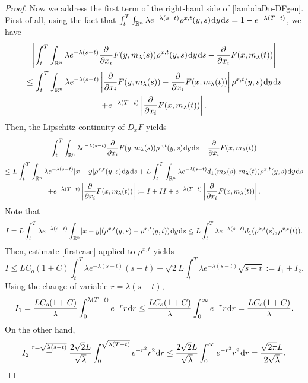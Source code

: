 \documentclass{amsart}
\theoremstyle{remark}
\theoremstyle{definition}
\theoremstyle{Claim}
\newcommand{\R}{\mathbb{R}}
\newcommand{\dd}{\hspace{0.7pt}{\rm d}}
\theoremstyle{plain}
\begin{document}
\begin{proof}
	Now we address the first term of the right-hand side of \eqref{lambdaDu-DFgen}. First of all, using the fact that $\int_{t}^{T}\int_{\R^n}\lambda e^{-\lambda(s-t)}\rho^{x,t}(y,s)\dd y\dd s=1-e^{-\lambda (T-t)}$, we have
		\begin{multline*}
			\left\lvert\int_{t}^{T}\int_{\R^n}\lambda e^{-\lambda (s-t)} \frac{\partial}{\partial x_i} F(y,m_\lambda(s)) \rho^{x,t}(y,s)\dd y\dd s-\frac{\partial}{\partial x_i}F(x,m_\lambda(t))\right\rvert\\\le \int_{t}^{T}\int_{\R^n}\lambda e^{-\lambda (s-t)} \left\lvert\frac{\partial}{\partial x_i} F(y,m_\lambda(s)) -\frac{\partial}{\partial x_i}F(x,m_\lambda(t))\right\rvert\rho^{x,t}(y,s)\dd y\dd s\\+e^{-\lambda(T-t)}\left\lvert\frac{\partial}{\partial x_i}F(x,m_\lambda(t))\right\rvert.
		\end{multline*}
		Then, the Lipschitz continuity of $D_xF$ yields
		\begin{multline*}
			\left\lvert\int_{t}^{T}\int_{\R^n}\lambda e^{-\lambda (s-t)} \frac{\partial}{\partial x_i} F(y,m_\lambda(s)) \rho^{x,t}(y,s)\dd y\dd s-\frac{\partial}{\partial x_i}F(x,m_\lambda(t))\right\rvert\\\le L\int_{t}^{T}\int_{\R^n}\lambda e^{-\lambda (s-t)} \lvert x-y\rvert\rho^{x,t}(y,s)\dd y\dd s+L\int_{t}^{T}\int_{\R^n}\lambda e^{-\lambda (s-t)} d_1(m_\lambda(s),m_\lambda(t))\rho^{x,t}(y,s)\dd y\dd s\\+e^{-\lambda(T-t)}\left\lvert\frac{\partial}{\partial x_i}F(x,m_\lambda(t))\right\rvert:=I+II+e^{-\lambda(T-t)}\left\lvert\frac{\partial}{\partial x_i}F(x,m_\lambda(t))\right\rvert.
		\end{multline*}
	Note that
	$$I= L\int_{t}^{T}\lambda e^{-\lambda (s-t)}\int_{\R^n}\lvert x -y\rvert ( \rho^{x,t}(y,s) -\rho^{x,t}(y,t))\dd y\dd s\leq L\int_{t}^{T}\lambda e^{-\lambda (s-t)}d_1(\rho^{x,t}(s),\rho^{x,t}(t)).$$
	Then, estimate \eqref{firstcase} applied to $\rho^{x,t}$ yields
	$$I\leq L{C_o(1+C)}\int_{t}^{T}\lambda e^{-\lambda (s-t)}(s-t)+\sqrt{2}L\int_{t}^{T}\lambda e^{-\lambda (s-t)}\sqrt{s-t}:=I_1+I_2.$$
	Using the change of variable $r=\lambda (s-t)$,
	$$I_1=\frac{L{C_o(1+C)}}{\lambda}\int_{0}^{\lambda(T-t)}e^{-r} r \dd r\leq \frac{L{C_o(1+C)}}{\lambda}\int_{0}^{\infty}e^{-r} r \dd r=\frac{L{C_o(1+C)}}{\lambda}.$$
	On the other hand, $$I_2\stackrel{r=\sqrt{\lambda(s-t)}}{=}\frac{2\sqrt{2}L}{\sqrt{\lambda}}\int_{0}^{\sqrt{\lambda(T-t)}}e^{-r^2}r^2\dd r\le \frac{2\sqrt{2}L}{\sqrt{\lambda}}\int_{0}^{\infty}e^{-r^2}r^2\dd r=\frac{\sqrt{2\pi}L}{2\sqrt{\lambda}}.$$

\end{proof}
\end{document}
